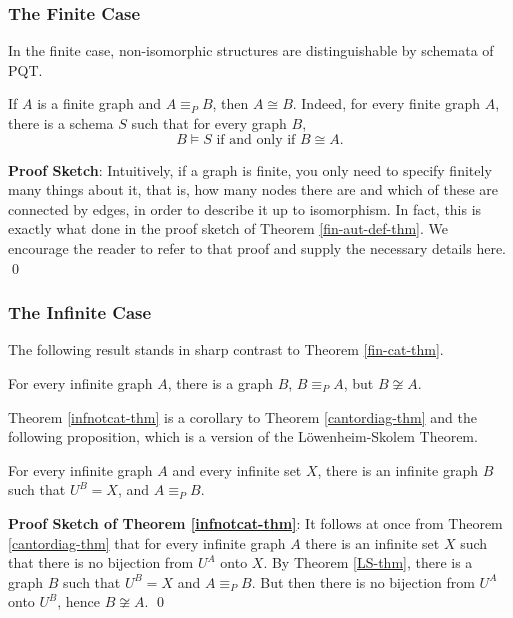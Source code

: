 \subsubsection*{The Finite Case}

In the finite case, non-isomorphic structures are distinguishable by schemata of PQT.
\begin{theorem}\label{fin-cat-thm}
If $A$ is a finite graph and $A\equiv_P B$, then $A\cong B$. Indeed, for every finite graph $A$, there is a schema $S$ such that 
 for every graph $B$, 
\[
B\models S \mbox{ if and only if } B\cong A.
\]
\end{theorem}
\textbf{Proof Sketch}: 
 Intuitively, if a graph is finite, you only need to specify finitely many things about it, that is, how many nodes there are  and which of these are connected by edges, in order to describe it up to isomorphism. In fact, this is exactly what done in the proof sketch of Theorem \ref{fin-aut-def-thm}. We encourage the reader to refer to that proof and supply the necessary details here. \qed
\subsubsection*{The Infinite Case}

The following result stands in sharp contrast to Theorem \ref{fin-cat-thm}.
\begin{theorem}\label{infnotcat-thm}
For every infinite graph $A$, there is a graph $B$, $B\equiv_P A$, but $B\not\cong A$.
\end{theorem}
Theorem \ref{infnotcat-thm} is a corollary to Theorem \ref{cantordiag-thm} and the following proposition, which is a version of the L\"{o}wenheim-Skolem Theorem.
\begin{theorem}\label{LS-thm}
For every infinite graph $A$ and every infinite set $X$, there is an infinite graph $B$ such that $U^B=X$, and $A\equiv_P B$.
\end{theorem}
\textbf{Proof Sketch of Theorem \ref{infnotcat-thm}}: It follows at once from Theorem \ref{cantordiag-thm} that for every infinite graph $A$ there is an infinite set $X$ such that there is no bijection from $U^A$ onto $X$. By Theorem \ref{LS-thm}, there is a graph $B$ such that $U^B=X$ and $A\equiv_P B$. But then there is no bijection from $U^A$ onto $U^B$, hence $B\not\cong A$. \qed
